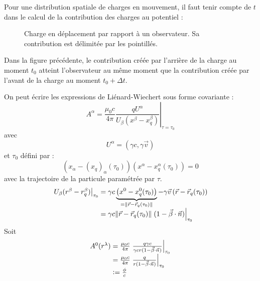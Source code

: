 \begin{remark}
Pour une distribution spatiale de charges en mouvement, il faut tenir compte de $t$ dans le calcul de la contribution des charges au potentiel :
	\begin{figure}[H]
	\centering
	\caption*{Charge en déplacement par rapport à un observateur. Sa contribution est délimitée par les pointillés.}
	\end{figure}
Dans la figure précédente, le contribution créée par l'arrière de la charge au moment $t_0$ atteint l'observateur au même moment que la contribution créée par l'avant de la charge au moment $t_0 +\Delta t$.
\end{remark}

On peut écrire les expressions de Liénard-Wiechert sous forme covariante :
$$
	A^\alpha=\frac{\mu_0 c}{4\pi}\left.\frac{qU^\alpha}{U_\beta(x^\beta-x_q^\beta)}\right|_{\tau=\tau_0}
$$
avec 
$$
	U^\alpha=(\gamma c,\gamma\vec{v})
$$
et $\tau_0$ défini par :
$$
	\left(x_\alpha-(x_q)_\alpha(\tau_0)\right)\left(x^\alpha-x_q^\alpha(\tau_0)\right)=0
$$
avec la trajectoire de la particule paramétrée par $\tau$.
$$
	\begin{array}{r@{\;}l}
	\left.U_\beta(r^\beta-r_q^\beta)\right|_{\tau_0}
		&=\gamma c\underbrace{\left(x^0-x_q^0(\tau_0)\right)}_{=\|\vec{r}-\vec{r}_q(\tau_0)\|}
		-\gamma\vec{v}\left(\vec{r}-\vec{r}_q(\tau_0)\right)\\
		&=\gamma c\|\vec{r}-\vec{r}_q(\tau_0)\|\left.(1-\vec{\beta}\cdot\vec{n})\right|_{\tau_0}
	\end{array}
$$
Soit
$$
	\begin{array}{r@{\;}l}
		A^0(r^\lambda)&=\frac{\mu_0 c}{4\pi}\left.\frac{q\gamma c}{\gamma cr(1-\vec{\beta}\cdot\vec{n})}\right|_{\tau_0}\\
			&=\frac{\mu_0 c}{4\pi}\left.\frac{q}{r(1-\vec{\beta}\cdot\vec{n})}\right|_{\tau_0}\\
			&\defeq \frac{\phi}{c}
	\end{array}
$$


